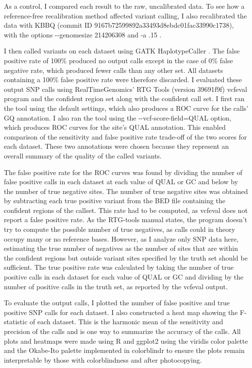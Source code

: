 As a control, I compared each result to the raw, uncalibrated data. To see how a reference-free recalibration method affected variant calling, I also recalibrated the data with KBBQ (commit ID 9167b72599892a33493d8ebdc01fac33990c1738), with the options -\phantom{}-genomesize 214206308 and -a .15 .

I then called variants on each dataset using GATK HaplotypeCaller \parencite{poplin_scaling_2018}. The false positive rate of 100\% produced no output calls except in the case of 0\% false negative rate, which produced fewer calls than any other set. All datasets containing a 100\% false positive rate were therefore discarded. I evaluated these output SNP calls using RealTimeGenomics' RTG Tools (version 39691f9f) vcfeval program \parencite{cleary_comparing_2015} and the confident region set along with the confident call set. I first ran the tool using the default settings, which also produces a ROC curve for the calls' GQ annotation. I also ran the tool using the -\phantom{}-vcf-score-field=QUAL option, which produces ROC curves for the site's QUAL annotation. This enabled comparison of the sensitivity and false positive rate trade-off of the two scores for each dataset. These two annotations were chosen because they represent an overall summary of the quality of the called variants.

The false positive rate for the ROC curves was found by dividing the number of false positive calls in each dataset at each value of QUAL or GC and below by the number of true negative sites. The number of true negative sites was obtained by subtracting each true positive variant from the BED file containing the confident regions of the callset. This rate had to be computed, as vcfeval does not report a false positive rate. As the RTG-tools manual states, the program doesn't try to compute the possible number of true negatives, as calls could in theory occupy many or no reference bases. However, as I analyze only SNP data here,  estimating the true number of negatives as the number of sites that are within the confident regions but outside variant sites specified by the truth set should be sufficient. The true positive rate was calculated by taking the number of true positive calls in each dataset for each value of QUAL or GC and dividing by the number of positive calls in the truth set, as reported by the vcfeval output.

To evaluate the output calls, I plotted the number of false positive and true positive SNP calls for each dataset. I also constructed a heat map showing the F-statistic of each dataset. This is the harmonic mean of the sensitivity and precision of the calls and is one way to summarize the accuracy of the calls. All plots and heatmaps were made using R \parencite{r_core_2020} and ggplot2 \parencite{wickham_ggplot2_2016} using the viridis color palette \parencite{garnier_viridis_2018} and the Okabe-Ito palette implemented in colorblindr to ensure the plots remain interpretable by those with colorblindness and after photocopying.

